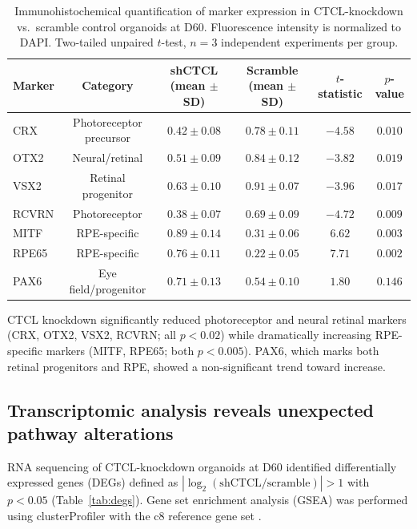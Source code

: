 \documentclass[11pt]{article}
\begin{document}
\begin{table}[H]
\centering
\caption{Immunohistochemical quantification of marker expression in CTCL-knockdown vs.\ scramble control organoids at D60. Fluorescence intensity is normalized to DAPI. Two-tailed unpaired $t$-test, $n = 3$ independent experiments per group.}
\label{tab:kd_phenotype}
\begin{tabular}{lccccc}
\toprule
\textbf{Marker} & \textbf{Category} & \textbf{shCTCL (mean $\pm$ SD)} & \textbf{Scramble (mean $\pm$ SD)} & \textbf{$t$-statistic} & \textbf{$p$-value} \\
\midrule
CRX & Photoreceptor precursor & $0.42 \pm 0.08$ & $0.78 \pm 0.11$ & $-4.58$ & $0.010$ \\
OTX2 & Neural/retinal & $0.51 \pm 0.09$ & $0.84 \pm 0.12$ & $-3.82$ & $0.019$ \\
VSX2 & Retinal progenitor & $0.63 \pm 0.10$ & $0.91 \pm 0.07$ & $-3.96$ & $0.017$ \\
RCVRN & Photoreceptor & $0.38 \pm 0.07$ & $0.69 \pm 0.09$ & $-4.72$ & $0.009$ \\
MITF & RPE-specific & $0.89 \pm 0.14$ & $0.31 \pm 0.06$ & $6.62$ & $0.003$ \\
RPE65 & RPE-specific & $0.76 \pm 0.11$ & $0.22 \pm 0.05$ & $7.71$ & $0.002$ \\
PAX6 & Eye field/progenitor & $0.71 \pm 0.13$ & $0.54 \pm 0.10$ & $1.80$ & $0.146$ \\
\bottomrule
\end{tabular}
\end{table}

CTCL knockdown significantly reduced photoreceptor and neural retinal markers (CRX, OTX2, VSX2, RCVRN; all $p < 0.02$) while dramatically increasing RPE-specific markers (MITF, RPE65; both $p < 0.005$). PAX6, which marks both retinal progenitors and RPE, showed a non-significant trend toward increase.

\subsection{Transcriptomic analysis reveals unexpected pathway alterations}

RNA sequencing of CTCL-knockdown organoids at D60 identified differentially expressed genes (DEGs) defined as $|\log_{2}(\text{shCTCL}/\text{scramble})| > 1$ with $p < 0.05$ (Table~\ref{tab:degs}). Gene set enrichment analysis (GSEA) was performed using clusterProfiler \citep{wu2021clusterprofiler} with the c8 reference gene set \citep{subramanian2005gsea}.
\end{document}
